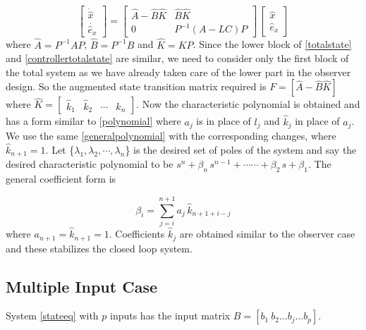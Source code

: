 \documentclass{elsarticle}
\numberwithin{equation}{section}
\begin{document}
\begin{equation}\label{controllertotalstate}
	\begin{bmatrix}
	\dot{\widehat{x}} \\
	\dot{\widehat{e}_x}
	\end{bmatrix}
	=
	\begin{bmatrix}
	\widehat{A}-\widehat{B}\widehat{K} & \widehat{B}\widehat{K} \\
	0 & P^{-1}(A-LC)P
	\end{bmatrix}
	\,
	\begin{bmatrix}
	\widehat{x} \\
	\widehat{e}_x
	\end{bmatrix}
\end{equation}
where $\widehat{A}=P^{-1}AP$, $\widehat{B}=P^{-1}B$ and $\widehat{K}= KP$.
Since the lower block of \eqref{totalstate} and \eqref{controllertotalstate} are similar, we need to consider only the first block of the total system as we have already taken care of the lower part in the observer design. So the augmented state transition matrix required is $F=[\widehat{A}-\widehat{B} \widehat{K}]$ where $\widehat{K} =\begin{bmatrix}
\widehat{k}_1 & \widehat{k}_2 &\cdots& \widehat{k}_n \end{bmatrix}$. Now the characteristic polynomial is obtained and has a form similar to \eqref{polynomial} where $a_j$ is in place of $l_j$ and $\widehat{k}_j$ in place of $a_j$. We use the same \eqref{generalpolynomial} with the corresponding changes, where $\widehat{k}_{n+1} =1 $. Let \{$\lambda_1, \lambda_2, \cdots, \lambda_n$\} is the desired set of poles of the system and say the desired characteristic polynomial to be $s^{n}+\beta_n\,s^{n-1}+\cdots\cdots+\beta_2\,s+\beta_1$. The general coefficient form is

\begin{equation}\label{generalcoefficentcontroller}
	\beta_i=\sum_{j=i}^{n+1}a_j\, \widehat{k}_{n+1+i-j}
\end{equation}
where $a_{n+1}=\widehat{k}_{n+1}=1$. Coefficients $\widehat{k}_j$ are obtained similar to the observer case and these stabilizes the closed loop system.

\subsection{Multiple Input Case}
System \eqref{stateeq} with $p$ inputs has the input matrix $B= \left[ b_1\ b_2 \ldots b_j \ldots b_p \right]$. \\
\end{document}
